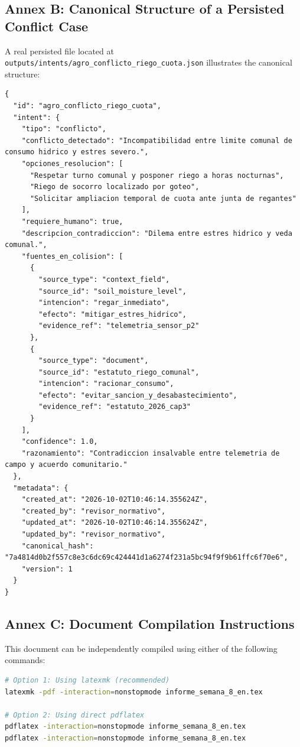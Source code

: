 \documentclass[11pt,a4paper]{article}
\begin{document}
\subsection{Annex B: Canonical Structure of a Persisted Conflict Case}
A real persisted file located at \texttt{outputs/intents/agro\_conflicto\_riego\_cuota.json} illustrates the canonical structure:
\begin{lstlisting}[basicstyle=\ttfamily\scriptsize]
{
  "id": "agro_conflicto_riego_cuota",
  "intent": {
    "tipo": "conflicto",
    "conflicto_detectado": "Incompatibilidad entre limite comunal de consumo hidrico y estres severo.",
    "opciones_resolucion": [
      "Respetar turno comunal y posponer riego a horas nocturnas",
      "Riego de socorro localizado por goteo",
      "Solicitar ampliacion temporal de cuota ante junta de regantes"
    ],
    "requiere_humano": true,
    "descripcion_contradiccion": "Dilema entre estres hidrico y veda comunal.",
    "fuentes_en_colision": [
      {
        "source_type": "context_field",
        "source_id": "soil_moisture_level",
        "intencion": "regar_inmediato",
        "efecto": "mitigar_estres_hidrico",
        "evidence_ref": "telemetria_sensor_p2"
      },
      {
        "source_type": "document",
        "source_id": "estatuto_riego_comunal",
        "intencion": "racionar_consumo",
        "efecto": "evitar_sancion_y_desabastecimiento",
        "evidence_ref": "estatuto_2026_cap3"
      }
    ],
    "confidence": 1.0,
    "razonamiento": "Contradiccion insalvable entre telemetria de campo y acuerdo comunitario."
  },
  "metadata": {
    "created_at": "2026-10-02T10:46:14.355624Z",
    "created_by": "revisor_normativo",
    "updated_at": "2026-10-02T10:46:14.355624Z",
    "updated_by": "revisor_normativo",
    "canonical_hash": "7a4814d0b2f557c8e3c6dc69c424441d1a6274f231a5bc94f9f9b61ffc6f70e6",
    "version": 1
  }
}
\end{lstlisting}

\subsection{Annex C: Document Compilation Instructions}
This document can be independently compiled using either of the following commands:
\begin{lstlisting}[language=bash]
# Option 1: Using latexmk (recommended)
latexmk -pdf -interaction=nonstopmode informe_semana_8_en.tex

# Option 2: Using direct pdflatex
pdflatex -interaction=nonstopmode informe_semana_8_en.tex
pdflatex -interaction=nonstopmode informe_semana_8_en.tex
\end{lstlisting}
\end{document}
